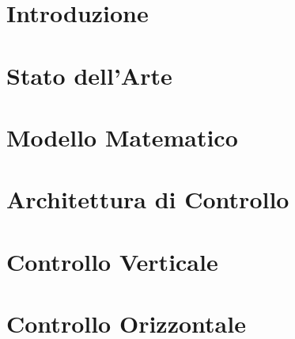 \documentclass[a4paper,12pt]{report}
\begin{document}
\tableofcontents
\listoffigures
\listoftables
\newpage


\chapter{Introduzione}
\label{ch:introduzione}
 

\chapter{Stato dell'Arte}
\label{ch:stato_arte}
 

\chapter{Modello Matematico}
\label{ch:modello}



% 

\chapter{Architettura di Controllo}
\label{ch:panoramica}


\chapter{Controllo Verticale} 
\label{ch:controllo_verticale}


\chapter{Controllo Orizzontale} 
\label{ch:controllo_orizzontale}
 
\end{document}
